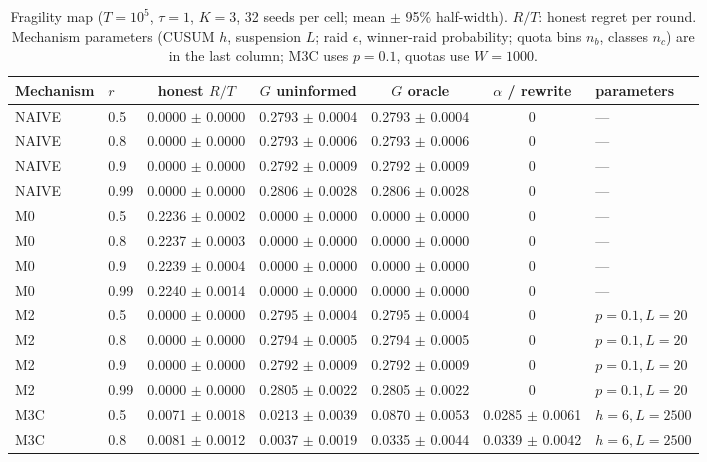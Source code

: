 \documentclass[10pt]{article}
\begin{document}
\begin{table}[t]
\centering\footnotesize\setlength{\tabcolsep}{3.5pt}
\caption{Fragility map ($T{=}10^5$, $\tau{=}1$, $K{=}3$, 32 seeds per cell; mean $\pm$ 95\% half-width). $R/T$: honest regret per round. Mechanism parameters (CUSUM $h$, suspension $L$; raid $\epsilon$, winner-raid probability; quota bins $n_b$, classes $n_c$) are in the last column; M3C uses $p{=}0.1$, quotas use $W{=}1000$.}\label{tab:map}
\begin{tabular}{@{}llccccl@{}}
\toprule
Mechanism & $r$ & honest $R/T$ & $G$ uninformed & $G$ oracle & $\alpha$ / rewrite & parameters \\ \midrule
NAIVE & 0.5 & 0.0000 $\pm$ 0.0000 & 0.2793 $\pm$ 0.0004 & 0.2793 $\pm$ 0.0004 & 0 & --- \\
NAIVE & 0.8 & 0.0000 $\pm$ 0.0000 & 0.2793 $\pm$ 0.0006 & 0.2793 $\pm$ 0.0006 & 0 & --- \\
NAIVE & 0.9 & 0.0000 $\pm$ 0.0000 & 0.2792 $\pm$ 0.0009 & 0.2792 $\pm$ 0.0009 & 0 & --- \\
NAIVE & 0.99 & 0.0000 $\pm$ 0.0000 & 0.2806 $\pm$ 0.0028 & 0.2806 $\pm$ 0.0028 & 0 & --- \\
\midrule
M0 & 0.5 & 0.2236 $\pm$ 0.0002 & 0.0000 $\pm$ 0.0000 & 0.0000 $\pm$ 0.0000 & 0 & --- \\
M0 & 0.8 & 0.2237 $\pm$ 0.0003 & 0.0000 $\pm$ 0.0000 & 0.0000 $\pm$ 0.0000 & 0 & --- \\
M0 & 0.9 & 0.2239 $\pm$ 0.0004 & 0.0000 $\pm$ 0.0000 & 0.0000 $\pm$ 0.0000 & 0 & --- \\
M0 & 0.99 & 0.2240 $\pm$ 0.0014 & 0.0000 $\pm$ 0.0000 & 0.0000 $\pm$ 0.0000 & 0 & --- \\
\midrule
M2 & 0.5 & 0.0000 $\pm$ 0.0000 & 0.2795 $\pm$ 0.0004 & 0.2795 $\pm$ 0.0004 & 0 & $p{=}0.1,L{=}20$ \\
M2 & 0.8 & 0.0000 $\pm$ 0.0000 & 0.2794 $\pm$ 0.0005 & 0.2794 $\pm$ 0.0005 & 0 & $p{=}0.1,L{=}20$ \\
M2 & 0.9 & 0.0000 $\pm$ 0.0000 & 0.2792 $\pm$ 0.0009 & 0.2792 $\pm$ 0.0009 & 0 & $p{=}0.1,L{=}20$ \\
M2 & 0.99 & 0.0000 $\pm$ 0.0000 & 0.2805 $\pm$ 0.0022 & 0.2805 $\pm$ 0.0022 & 0 & $p{=}0.1,L{=}20$ \\
\midrule
M3C & 0.5 & 0.0071 $\pm$ 0.0018 & 0.0213 $\pm$ 0.0039 & 0.0870 $\pm$ 0.0053 & 0.0285 $\pm$ 0.0061 & $h{=}6,L{=}2500$ \\
M3C & 0.8 & 0.0081 $\pm$ 0.0012 & 0.0037 $\pm$ 0.0019 & 0.0335 $\pm$ 0.0044 & 0.0339 $\pm$ 0.0042 & $h{=}6,L{=}2500$ \\

\end{tabular}
\end{table}
\end{document}
